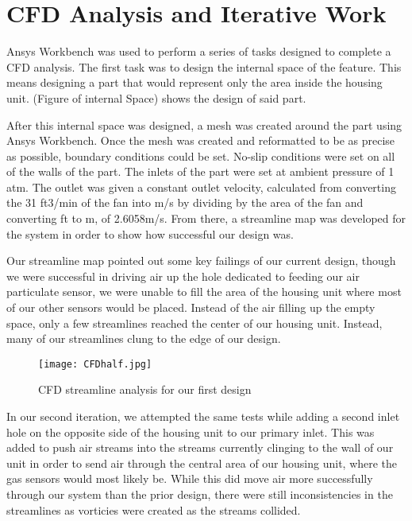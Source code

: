 \section{CFD Analysis and Iterative Work}

Ansys Workbench was used to perform a series of tasks designed to complete a CFD analysis. The first task was to design the internal space of the feature. This means designing a part that would represent only the area inside the housing unit. (Figure of internal Space) shows the design of said part.

After this internal space was designed, a mesh was created around the part using Ansys Workbench. Once the mesh was created and reformatted to be as precise as possible, boundary conditions could be set. No-slip conditions were set on all of the walls of the part. The inlets of the part were set at ambient pressure of 1 atm. The outlet was given a constant outlet velocity, calculated from converting the 31 ft3/min of the fan into m/s by dividing by the area of the fan and converting ft to m, of 2.6058m/s. From there, a streamline map was developed for the system in order to show how successful our design was.

Our streamline map pointed out some key failings of our current design, though we were successful in driving air up the hole dedicated to feeding our air particulate sensor, we were unable to fill the area of the housing unit where most of our other sensors would be placed. Instead of the air filling up the empty space, only a few streamlines reached the center of our housing unit. Instead, many of our streamlines clung to the edge of our design.

\begin{figure}[H]
	\centering
	\texttt{[image: CFDhalf.jpg]}
	\caption{CFD streamline analysis for our first design}
	\label{fig:CFD1}
\end{figure}

In our second iteration, we attempted the same tests while adding a second inlet hole on the opposite side of the housing unit to our primary inlet. This was added to push air streams into the streams currently clinging to the wall of our unit in order to send air through the central area of our housing unit, where the gas sensors would most likely be. While this did move air more successfully through our system than the prior design, there were still inconsistencies in the streamlines as vorticies were created as the streams collided.

